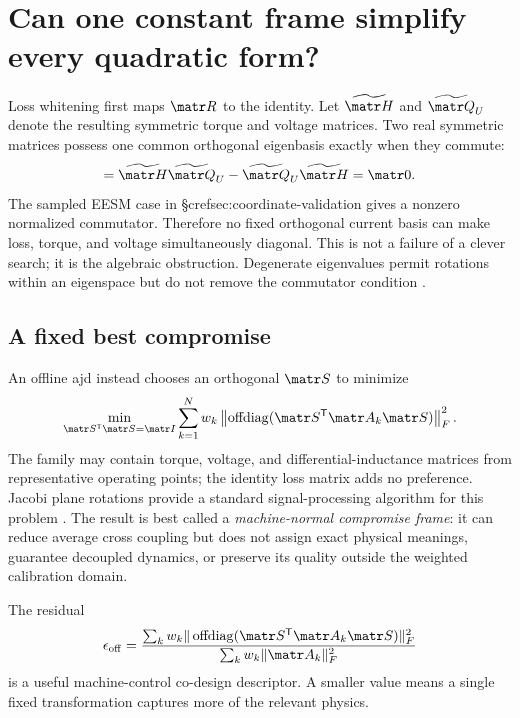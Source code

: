 \section{Can one constant frame simplify every quadratic form?}
\label{sec:joint-diagonalization}

Loss whitening first maps \(\matr R\) to the identity. Let
\(\widetilde{\matr H}\) and \(\widetilde{\matr Q}_U\) denote the resulting
symmetric torque and voltage matrices. Two real symmetric matrices possess
one common orthogonal eigenbasis exactly when they commute:
\begin{equation}
 [\widetilde{\matr H},\widetilde{\matr Q}_U]
 =\widetilde{\matr H}\widetilde{\matr Q}_U
 -\widetilde{\matr Q}_U\widetilde{\matr H}=\matr0.
 \label{eq:commutator-test}
\end{equation}
The sampled EESM case in §cref{sec:coordinate-validation} gives a nonzero
normalized commutator. Therefore no fixed orthogonal current basis can make
loss, torque, and voltage simultaneously diagonal. This is not a failure of a
clever search; it is the algebraic obstruction. Degenerate eigenvalues permit
rotations within an eigenspace but do not remove the commutator condition
\cite{horn2013}.



\subsection{A fixed best compromise}

An offline \gls{ajd} instead chooses an orthogonal \(\matr S\) to minimize
\begin{equation}
 \min_{\matr S^{\mathsf T}\matr S=\matr I}
 \sum_{k=1}^{N}w_k
 \left\|\operatorname{offdiag}
  (\matr S^{\mathsf T}\matr A_k\matr S)\right\|_F^2.
 \label{eq:ajd-objective}
\end{equation}
The family may contain torque, voltage, and differential-inductance matrices
from representative operating points; the identity loss matrix adds no
preference. Jacobi plane rotations provide a standard signal-processing
algorithm for this problem \cite{cardoso1996joint}. The result is best called
a \emph{machine-normal compromise frame}: it can reduce average cross coupling
but does not assign exact physical meanings, guarantee decoupled dynamics, or
preserve its quality outside the weighted calibration domain.

The residual
\[
 \epsilon_{\mathrm{off}}=
 \frac{\sum_kw_k\|\operatorname{offdiag}
 (\matr S^{\mathsf T}\matr A_k\matr S)\|_F^2}
 {\sum_kw_k\|\matr A_k\|_F^2}
\]
is a useful machine-control co-design descriptor. A smaller value means a
single fixed transformation captures more of the relevant physics.

